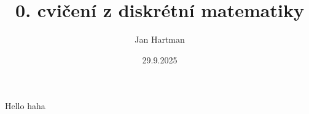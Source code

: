 \documentclass[11pt]{article}
\title{0. cvičení z diskrétní matematiky}
\author{Jan Hartman}
\date{29.9.2025}
\begin{document}
\noindent
Hello haha 
\end{document}
